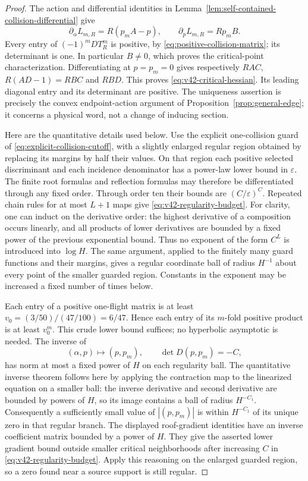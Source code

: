 \begin{proof}
The action and differential identities in
Lemma~\ref{lem:self-contained-collision-differential} give
\[
 \partial_\alpha L_{m,R}=R(p_m A-p),\qquad
 \partial_p L_{m,R}=Rp_m B.
\]
Every entry of $(-1)^mDT_R^m$ is positive, by
\eqref{eq:positive-collision-matrix}; its determinant is one.
In particular $B\ne0$, which proves the critical-point characterization.
Differentiating at $p=p_m=0$ gives respectively $RAC$,
$R(AD-1)=RBC$ and $RBD$. This proves
\eqref{eq:v42-critical-hessian}. Its leading diagonal entry and
its determinant are positive. The uniqueness assertion is precisely
the convex endpoint-action argument of
Proposition~\ref{prop:general-edge}; it concerns a physical word,
not a change of inducing section.

Here are the quantitative details used below. Use the explicit
one-collision guard of \eqref{eq:explicit-collision-cutoff}, with a
slightly enlarged regular region obtained by replacing its margins by
half their values. On that region each positive selected discriminant
and each incidence denominator has a power-law lower bound in
$\varepsilon$. The finite root formulas and reflection formulas may
therefore be differentiated through any fixed order. Through order
ten their bounds are $(C/\varepsilon)^C$. Repeated chain rules for
at most $L+1$ maps give \eqref{eq:v42-regularity-budget}. For clarity,
one can induct on the derivative order: the highest derivative of a
composition occurs linearly, and all products of lower derivatives
are bounded by a fixed power of the previous exponential bound.
Thus no exponent of the form $C^L$ is introduced into $\log H$.
The same argument, applied to the finitely many guard functions and
their margins, gives a regular coordinate ball of radius $H^{-1}$
about every point of the smaller guarded region. Constants in the
exponent may be increased a fixed number of times below.

Each entry of a positive one-flight matrix is at least
$v_0=(3/50)/(47/100)=6/47$. Hence each entry of its $m$-fold positive
product is at least $v_0^m$. This crude lower bound suffices; no
hyperbolic asymptotic is needed. The inverse of
\[
 (\alpha,p)\longmapsto(p,p_m),\qquad
 \det D(p,p_m)=-C,
\]
has norm at most a fixed power of $H$ on each regularity ball.
The quantitative inverse theorem follows here by applying the
contraction map to the linearized equation on a smaller ball: the
inverse derivative and second derivative are bounded by powers of
$H$, so its image contains a ball of radius $H^{-C_1}$.
Consequently a sufficiently small value of $|(p,p_m)|$ is within
$H^{-C_1}$ of its unique zero in that regular branch. The displayed
roof-gradient identities have an inverse coefficient matrix bounded
by a power of $H$. They give the asserted lower gradient bound outside
smaller critical neighborhoods after increasing $C$ in
\eqref{eq:v42-regularity-budget}. Apply this reasoning on the enlarged
guarded region, so a zero found near a source support is still regular.


\end{proof}
